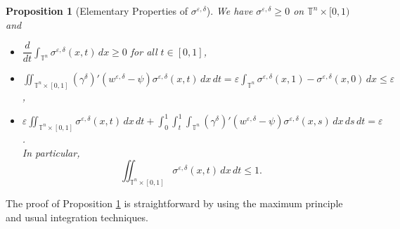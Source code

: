 \documentclass[12pt,reqno]{amsart}
\theoremstyle{plain}
\newtheorem{prop}[thm]{Proposition}
\theoremstyle{remark}
\numberwithin{equation}{section}
\begin{document}
\begin{prop}[Elementary Properties of ${\sigma}^{{\varepsilon},{\delta}}$]\label{prop:element}
We have ${\sigma}^{{\varepsilon},{\delta}} \ge 0$ on ${\mathbb{T}}^n\times[0,1)$ and
\begin{itemize}
\item[(i)]
$\displaystyle
\dfrac{d}{dt}\int_{{\mathbb{T}}^n} {\sigma}^{{\varepsilon},{\delta}}(x,t)\,dx\ge0$ 
for all $t \in [0,1]$, 
\item[(ii)]
$\displaystyle
\iint_{{\mathbb{T}}^n\times[0,1]}
({\gamma}^{\delta})'(w^{{\varepsilon},{\delta}}-\psi){\sigma}^{{\varepsilon},{\delta}}(x,t)\,dx\,dt
={\varepsilon}\int_{{\mathbb{T}}^n}{\sigma}^{{\varepsilon},{\delta}}(x,1)-{\sigma}^{{\varepsilon},{\delta}}(x,0)\,dx\le{\varepsilon}$,  
\item[(iii)]
$\displaystyle
{\varepsilon}\iint_{{\mathbb{T}}^n\times[0,1]}{\sigma}^{{\varepsilon},{\delta}}(x,t)\,dx\,dt
+
\int_{0}^{1}\int_{t}^{1}\int_{{\mathbb{T}}^n}
({\gamma}^{\delta})'(w^{{\varepsilon},{\delta}}-\psi){\sigma}^{{\varepsilon},{\delta}}(x,s)\,dx\,ds\,dt
={\varepsilon}$.  \\
In particular, 
\[
\iint_{{\mathbb{T}}^n\times[0,1]}{\sigma}^{{\varepsilon},{\delta}}(x,t)\,dx\,dt\le1. 
\]
\end{itemize}
\end{prop}
The proof of Proposition \ref{prop:element} is straightforward
by using the maximum principle and usual integration techniques. 
\end{document}
